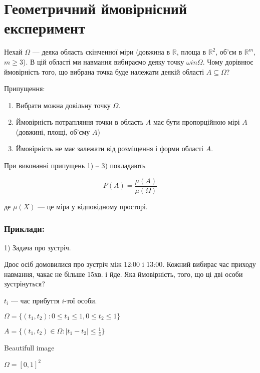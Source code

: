 \chapter{Геометричний ймовірнісний експеримент}

\begin{problem}
    Нехай $\Omega$ --- деяка область скінченної міри (довжина в $\mathbb{R}$,
    площа в $\mathbb{R}^2$, об'єм в $\mathbb{R}^m$, $m \geqslant 3$). В цій
    області ми навмання вибираємо деяку точку $\omega in \Omega$.
    Чому дорівнює ймовірність того, що вибрана точка буде
    належати деякій області $A \subseteq \Omega$? 
\end{problem}

Припущення:

\begin{enumerate}
    \item Вибрати можна довільну точку $\Omega$.
    \item Ймовірність потрапляння точки в область $A$
    має бути пропорційною мірі $A$ (довжині, площі, об'єму $A$)

    \item Ймовірність не має залежати від розміщення і форми
    області $A$.
\end{enumerate}

При виконанні припущень 1) -- 3) покладають

$$P(A) = \dfrac{\mu(A)}{\mu(\Omega)}$$

де $\mu(X)$ --- це міра у відповідному просторі.

\subsection*{Приклади:}

1) Задача про зустріч.

Двоє осіб домовилися про зустріч між 12:00 і 13:00. Кожний
вибирає час приходу навмання, чакає не більше 15хв. і йде.
Яка ймовірність, того, що ці дві особи зустрінуться?

$t_i$ --- час прибуття  $i$-тої особи.

$\Omega = \{(t_1, t_2): 0 \leqslant t_1 \leqslant 1, 0 \leqslant t_2 \leqslant 1\}$

$A = \{(t_1, t_2) \in \Omega: |t_1-t_2| \leqslant \frac{1}{4}\}$

\begin{center}
    Beautifull image
\end{center}

$\Omega = [0,1]^2$

